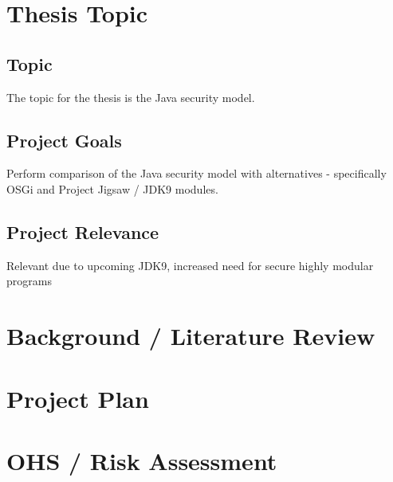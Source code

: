 \section{Thesis Topic}

\subsection{Topic}

The topic for the thesis is the Java security model.

\subsection{Project Goals}

Perform comparison of the Java security model with alternatives - specifically OSGi and Project Jigsaw / JDK9 modules.

\subsection{Project Relevance}

Relevant due to upcoming JDK9, increased need for secure highly modular programs

\section{Background / Literature Review}

\section{Project Plan}

\section{OHS / Risk Assessment}
